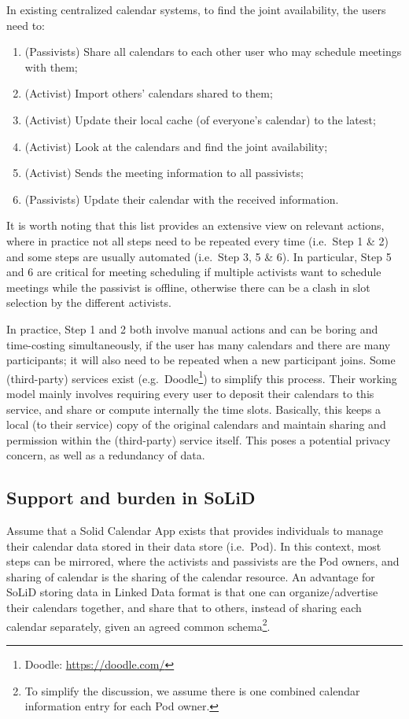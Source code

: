 \documentclass[
twocolumn,
]{ceurart}
\begin{document}
In existing centralized calendar systems, to find the joint availability, the users need to:
\begin{enumerate}
    \item (Passivists) Share all calendars to each other user who may schedule meetings with them;
    \item (Activist) Import others' calendars shared to them;
    \item (Activist) Update their local cache (of everyone's calendar) to the latest;
    \item (Activist) Look at the calendars and find the joint availability;
    \item (Activist) Sends the meeting information to all passivists;
    \item (Passivists) Update their calendar with the received information.
\end{enumerate}
%
It is worth noting that this list provides an extensive view on relevant actions, where in practice not all steps need to be repeated every time (i.e.~Step 1 \& 2) and some steps are usually automated (i.e.~Step 3, 5 \& 6). In particular, Step 5 and 6 are critical for meeting scheduling if multiple activists want to schedule meetings while the passivist is offline, otherwise there can be a clash in slot selection by the different activists.

In practice, Step 1 and 2 both involve manual actions and can be boring and time-costing simultaneously, if the user has many calendars and there are many participants; it will also need to be repeated when a new participant joins.
Some (third-party) services exist (e.g.~Doodle\footnote{Doodle: \url{https://doodle.com/}}) to simplify this process. Their working model mainly involves requiring every user to deposit their calendars to this service, and share or compute internally the time slots. Basically, this keeps a local (to their service) copy of the original calendars and maintain sharing and permission within the (third-party) service itself. This poses a potential privacy concern, as well as a redundancy of data.

\subsection{Support and burden in SoLiD}

Assume that a Solid Calendar App exists that provides individuals to manage their calendar data stored in their data store (i.e.~Pod). In this context, most steps can be mirrored, where the activists and passivists are the Pod owners, and sharing of calendar is the sharing of the calendar resource. An advantage for SoLiD storing data in Linked Data format is that one can organize/advertise their calendars together, and share that to others, instead of sharing each calendar separately, given an agreed common schema\footnote{To simplify the discussion, we assume there is one combined calendar information entry for each Pod owner.}. 
\end{document}
